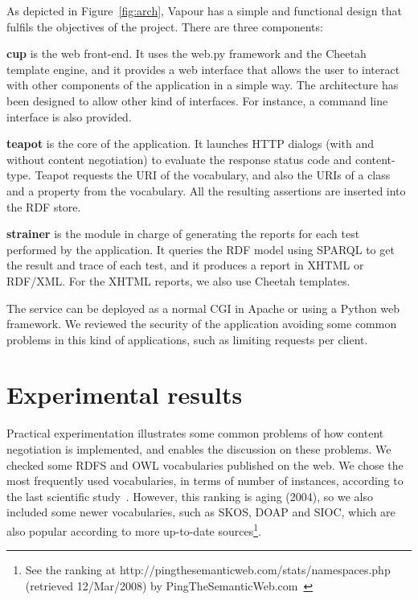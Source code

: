 \documentclass{../templates/llncs}
\begin{document}
As depicted in Figure~\ref{fig:arch}, Vapour has a simple and functional
design that fulfils the objectives of the project. There are three components:

\begin{description}

  \item \textbf{cup} is the web front-end. It uses the web.py framework
        and the Cheetah template engine, and it provides a web interface that allows 
        the user to interact with other components of the application in a 
        simple way. The architecture has been designed to allow other kind 
        of interfaces. For instance, a command line interface is also provided.

  \item \textbf{teapot} is the core of the application. It launches
        HTTP dialogs 
        (with and without content negotiation) to evaluate the response
        status code and content-type. Teapot requests the URI of the vocabulary, and 
        also the URIs of a class and a property from the vocabulary. All the resulting assertions are 
        inserted into the RDF store.

  \item \textbf{strainer} is the module in charge of generating the reports for
        each test performed by the application. It queries the RDF model using SPARQL %
        to get the result and trace of each test, and it produces 
        a report in XHTML or RDF/XML. For the XHTML reports, we also use Cheetah 
        templates.

\end{description}

The service can be deployed as a normal CGI in Apache or using a Python web 
framework. We reviewed the security of the application avoiding some common 
problems in this kind of applications, such as limiting requests per client.

\section{\label{sec:experimental}Experimental results}

Practical experimentation illustrates some common problems of how
content negotiation is implemented, and enables the discussion on 
these problems. We checked some RDFS and OWL vocabularies published on the web.
We chose the most frequently used vocabularies, in terms of number of
instances, according to the last scientific study~\cite{Li2005}. However,
this ranking is aging (2004), so we also included some newer
vocabularies, such as SKOS, DOAP and SIOC, which are also popular
according to more up-to-date sources\footnote{See the ranking at http://pingthesemanticweb.com/stats/namespaces.php (retrieved 12/Mar/2008) by PingTheSemanticWeb.com~\cite{Bojars2007}}.
\end{document}
